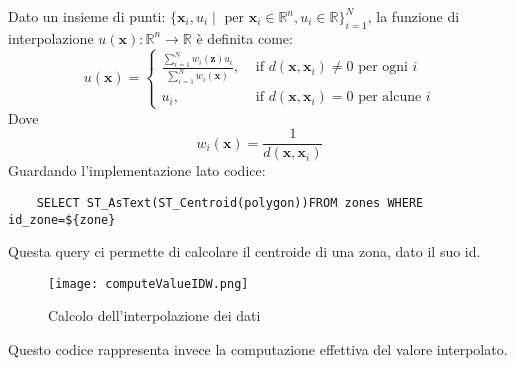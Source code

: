 \documentclass[../../Report.tex]{subfiles}
\begin{document}
    Dato un insieme di punti:  
    $ \{\mathbf{x}_i, u_i \mid \text{ per } \mathbf{x}_i \in \mathbb{R}^n, u_i \in \mathbb{R}\}_{i=1}^N $, la funzione di interpolazione $u(\mathbf{x}): \mathbb{R}^n \rightarrow \mathbb{R}$ è definita come:
    $$
    u(\mathbf{x})= 
    \begin{cases}
      \frac{\sum_{i=1}^N w_i(\mathbf{z}) u_i}{\sum_{i=1}^N w_i(\mathbf{x})},
       & \text { if } d(\mathbf{x}, \mathbf{x}_i) \neq 0 \text { per ogni  } i \\
      u_i, & \text{ if } d(\mathbf{x}, \mathbf{x}_i)=0 \text{ per alcune } i
    \end{cases}
    $$
    Dove
    $$
    w_i(\mathbf{x})=\frac{1}{d\left(\mathbf{x}, \mathbf{x}_i\right)}
    $$
    Guardando l'implementazione lato codice:
    \begin{lstlisting}
    SELECT ST_AsText(ST_Centroid(polygon))FROM zones WHERE id_zone=${zone}
    \end{lstlisting}
    Questa query ci permette di calcolare il centroide di una zona, dato il suo id.\\
    \begin{figure}[H]
      \texttt{[image: computeValueIDW.png]}
      \centering
      \caption{Calcolo dell'interpolazione dei dati}
      \label{fig:query2}
    \end{figure}
    Questo codice rappresenta invece la computazione effettiva del valore interpolato.\\
\end{document}
